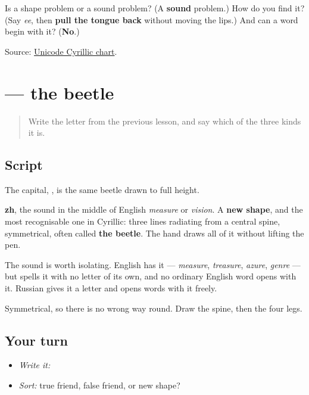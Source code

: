 \begin{tcolorbox}[breakable,colback=teal!4,colframe=teal!35!black,title={Before you move on}]
Is \textbf{} a shape problem or a sound problem? (A \textbf{sound} problem.) How do you find it? (Say \emph{ee}, then \textbf{pull the tongue back} without moving the lips.) And can a word begin with it? (\textbf{No}.)

Source: \href{https://www.unicode.org/charts/PDF/U0400.pdf}{Unicode Cyrillic chart}.
\end{tcolorbox}
\section[\texorpdfstring{\ru{ж} (zh)}{ж (zh)}]{ — the beetle}

\label{lesson:RU-W06-zh}



\begin{quote}
Write the letter from the previous lesson, and say which of the three kinds it is.
\end{quote}

\subsection*{Script}

\begin{quote}
   
\end{quote}

The capital, \textbf{}, is the same beetle drawn to full height.

\textbf{zh}, the sound in the middle of English \emph{measure} or \emph{vision}. A \textbf{new shape}, and the most recognisable one in Cyrillic: three lines radiating from a central spine, symmetrical, often called \textbf{the beetle}. The hand draws all of it without lifting the pen.

The sound is worth isolating. English has it — \emph{measure}, \emph{treasure}, \emph{azure}, \emph{genre} — but spells it with no letter of its own, and no ordinary English word opens with it. Russian gives it a letter and opens words with it freely.

Symmetrical, so there is no wrong way round. Draw the spine, then the four legs.

\subsection*{Your turn}
\begin{itemize}
\raggedright
  \item \emph{Write it:} 
  \item \emph{Sort:} true friend, false friend, or new shape?
\end{itemize}

